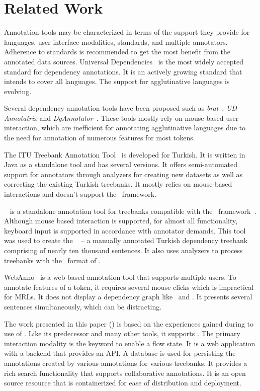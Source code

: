 \section{Related Work}
\label{sec:related}

Annotation tools may be characterized in terms of the support they provide for languages, user interface modalities, standards, and multiple annotators.
Adherence to standards is recommended to get the most benefit from the annotated data sources.
Universal Dependencies~\cite{UD} is the most widely accepted standard for dependency annotations.
It is an actively growing standard that intends to cover all languages.
The support for agglutinative languages is evolving.

Several dependency annotation tools have been proposed such as \textit{brat}~\cite{brat}, \textit{UD Annotatrix} and \textit{DgAnnotator}~\cite{UD-tools}.
These tools mostly rely on mouse-based user interaction, which are inefficient for annotating agglutinative languages due to the need for annotation of numerous features for most tokens.

The ITU Treebank Annotation Tool~\cite{pamay-etal-2015-annotation} is developed for Turkish.
It is written in Java as a standalone tool and has several versions.
It offers semi-automated support for annotators through analyzers for creating new datasets as well as correcting the existing Turkish treebanks.
It mostly relies on mouse-based interactions and doesn't support the \ud\ framework.

\boatvone~\cite{turk-etal-2019-turkish} is a standalone annotation tool for treebanks compatible with the \ud\ framework~\cite{UD}.
Although mouse based interaction is supported, for almost all functionality, keyboard input is supported in accordance with annotator demands.
This tool was used to create the \bountreebank~\cite{turk2021resources,UD-Boun-Treebank} -- a manually annotated Turkish dependency treebank comprising of nearly ten thousand sentences.
It also uses analyzers to process treebanks with the \conllu\ format of \ud.

WebAnno~\cite{webanno} is a web-based annotation tool that supports multiple users. 
To annotate features of a token, it requires several mouse clicks which is impractical for MRLs.
It does not display a dependency graph like \boatvone\ and \boatvtwo. 
It presents several sentences simultaneously, which can be distracting.

The work presented in this paper (\boatvtwo) is based on the experiences gained during to use of \boatvone.
Like its predecessor and many other tools, it supports \ud. 
The primary interaction modality is the keyword to enable a flow state. 
It is a web application with a backend that provides an API.
A database is used for persisting the annotations created by various annotations for various treebanks. 
It provides a rich search functionality that supports collaborative annotations. 
It is an open source resource that is containerized for ease of distribution and deployment.

